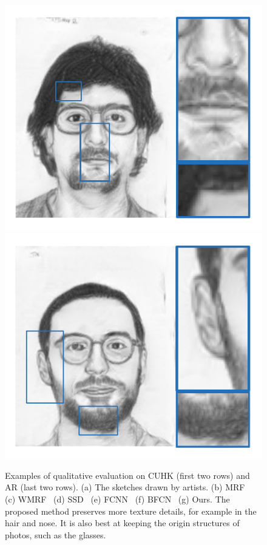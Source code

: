 \documentclass[10pt,twocolumn,letterpaper]{article}
\begin{document}
\begin{figure}[htbp]
{\begin{minipage}[b]{0.13\linewidth}
\includegraphics[width=0.99\linewidth]{img/sketch_result/example3_ours.pdf}
\includegraphics[width=0.99\linewidth]{img/sketch_result/example4_ours.pdf}
\end{minipage}
}
\caption{Examples of qualitative evaluation on CUHK (first two rows) and AR (last two rows). (a) The sketches drawn by artists. (b) MRF~\cite{wang2009face} (c) WMRF~\cite{zhou2012markov} (d) SSD~\cite{song2014real} (e) FCNN~\cite{zhang2015end} (f) BFCN~\cite{zhang2017content} (g) Ours. The proposed method preserves more texture details, for example in the hair and nose. It is also best at keeping the origin structures of photos, such as the glasses.}
\label{fig:qua_eval}
\end{figure}
\end{document}
